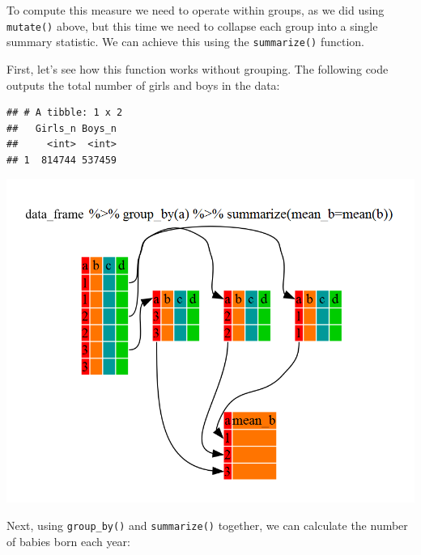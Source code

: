 \documentclass[]{book}
\newenvironment{Shaded}{\begin{snugshade}}{\end{snugshade}}
\newcommand{\DataTypeTok}[1]{\textcolor[rgb]{0.13,0.29,0.53}{#1}}
\newcommand{\KeywordTok}[1]{\textcolor[rgb]{0.13,0.29,0.53}{\textbf{#1}}}
\newcommand{\NormalTok}[1]{#1}
\newcommand{\OperatorTok}[1]{\textcolor[rgb]{0.81,0.36,0.00}{\textbf{#1}}}
\newcommand{\StringTok}[1]{\textcolor[rgb]{0.31,0.60,0.02}{#1}}
\begin{document}
To compute this measure we need to operate within groups, as
we did using \texttt{mutate()} above, but this time we need to collapse each
group into a single summary statistic. We can achieve this using the
\texttt{summarize()} function.

First, let's see how this function works without grouping. The following
code outputs the total number of girls and boys in the data:

\begin{Shaded}
\end{Shaded}

\begin{verbatim}
## # A tibble: 1 x 2
##   Girls_n Boys_n
##     <int>  <int>
## 1  814744 537459
\end{verbatim}

\includegraphics{R/Rintro/images/split-apply-combine.png}

Next, using \texttt{group\_by()} and \texttt{summarize()} together, we can calculate the
number of babies born each year:

\begin{Shaded}
\end{Shaded}
\end{document}
